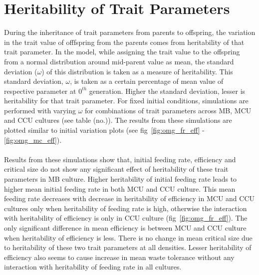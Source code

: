 \section{Heritability of Trait Parameters}
During the inheritance of trait parameters from parents to offspring, the variation in the trait value of offfspring from the parents comes from heritability of that trait parameter. In the model, while assigning the trait value to the offspring from a normal distribution around mid-parent value as mean, the standard deviation ($\omega$) of this distribution is taken as a measure of heritability. This standard deviation, $\omega$, is taken as a certain percentage of mean value of respective parameter at $0^{th}$ generation. Higher the standard deviation, lesser is heritability for that trait parameter. For fixed initial conditions, simulations are performed with varying $\omega$ for combinations of trait parameters across MB, MCU and CCU cultures (see table (no.)). The results from these simulations are plotted similar to initial variation plots (see fig~\ref{fig:omg_fr_eff} - \ref{fig:omg_mc_eff}).\\\\
Results from these simulations show that, initial feeding rate, efficiency and critical size do not show any significant effect of heritability of these trait parameters in MB culture. Higher heritability of initial feeding rate leads to higher mean initial feeding rate in both MCU and CCU culture. This mean feeding rate decreases with decrease in heritability of efficiency in MCU and CCU cultures only when heritability of feeding rate is high, otherwise the interaction with heritability of efficiency is only in CCU culture (fig~\ref{fig:omg_fr_eff}). The only significant difference in mean efficiency is between MCU and CCU culture when heritability of efficiency is less. There is no change in mean critical size due to heritability of these two trait parameters at all densities. Lesser heritability of efficiency also seems to cause increase in mean waste tolerance without any interaction with heritability of feeding rate in all cultures.
